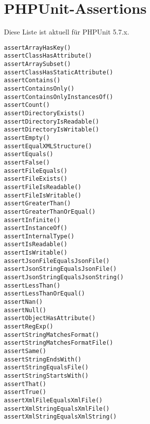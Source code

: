 \documentclass[a4paper,10pt,headsepline]{scrartcl}
\begin{document}
\pagebreak
\section{PHPUnit-Assertions}
Diese Liste ist aktuell für PHPUnit 5.7.x.

\begin{verbatim}
assertArrayHasKey()
assertClassHasAttribute()
assertArraySubset()
assertClassHasStaticAttribute()
assertContains()
assertContainsOnly()
assertContainsOnlyInstancesOf()
assertCount()
assertDirectoryExists()
assertDirectoryIsReadable()
assertDirectoryIsWritable()
assertEmpty()
assertEqualXMLStructure()
assertEquals()
assertFalse()
assertFileEquals()
assertFileExists()
assertFileIsReadable()
assertFileIsWritable()
assertGreaterThan()
assertGreaterThanOrEqual()
assertInfinite()
assertInstanceOf()
assertInternalType()
assertIsReadable()
assertIsWritable()
assertJsonFileEqualsJsonFile()
assertJsonStringEqualsJsonFile()
assertJsonStringEqualsJsonString()
assertLessThan()
assertLessThanOrEqual()
assertNan()
assertNull()
assertObjectHasAttribute()
assertRegExp()
assertStringMatchesFormat()
assertStringMatchesFormatFile()
assertSame()
assertStringEndsWith()
assertStringEqualsFile()
assertStringStartsWith()
assertThat()
assertTrue()
assertXmlFileEqualsXmlFile()
assertXmlStringEqualsXmlFile()
assertXmlStringEqualsXmlString()
\end{verbatim}
\end{document}
